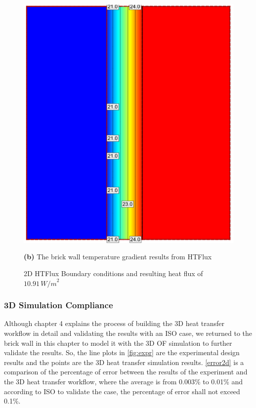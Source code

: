 \begin{figure}[H]
\begin{minipage}{0.49\textwidth}
  \includegraphics[width=\linewidth]{Figures/2dsim.png} 
  \caption*{\textbf{(b)} The brick wall temperature gradient results from HTFlux}
\end{minipage}
\caption[2D HTFlux Boundary conditions]{2D HTFlux Boundary conditions and resulting heat flux of \( 10.91 \, {W/m}^2 \)}
\label{2dconst}
\end{figure}


\subsubsection{3D Simulation Compliance}\label{3dbrick}
Although chapter 4 explains the process of building the 3D heat transfer workflow in detail and validating the results with an ISO case, we returned to the brick wall in this chapter to model it with the 3D \gls{OF} simulation to further validate the results. So, the line plots in \ref{fig:expr} are the experimental design results and the points are the 3D heat transfer simulation results. \ref{error2d} is a comparison of the percentage of error between the results of the experiment and the 3D heat transfer workflow, where the average is from 0.003\% to 0.01\% and according to ISO\cite{ISO} to validate the case, the percentage of error shall not exceed 0.1\%.






